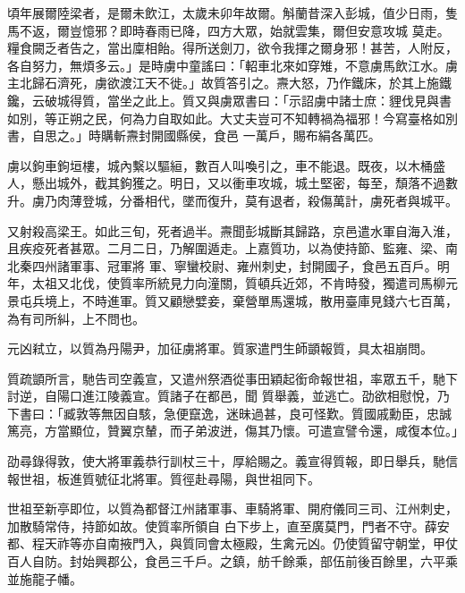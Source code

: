 \begin{pinyinscope}
 頃年展爾陸梁者，是爾未飲江，太歲未卯年故爾。斛蘭昔深入彭城，值少日雨，隻馬不返，爾豈憶邪？即時春雨已降，四方大眾，始就雲集，爾但安意攻城
 莫走。糧食闕乏者告之，當出廩相飴。得所送劍刀，欲令我揮之爾身邪！甚苦，人附反，各自努力，無煩多云。」是時虜中童謠曰：「軺車北來如穿雉，不意虜馬飲江水。虜主北歸石濟死，虜欲渡江天不徙。」故質答引之。燾大怒，乃作鐵床，於其上施鐵鑱，云破城得質，當坐之此上。質又與虜眾書曰：「示詔虜中諸士庶：貍伐見與書如別，等正朔之民，何為力自取如此。大丈夫豈可不知轉禍為福邪！今寫臺格如別書，自思之。」時購斬燾封開國縣侯，食邑
 一萬戶，賜布絹各萬匹。



 虜以鉤車鉤垣樓，城內繫以驅絙，數百人叫喚引之，車不能退。既夜，以木桶盛人，懸出城外，截其鉤獲之。明日，又以衝車攻城，城土堅密，每至，頹落不過數升。虜乃肉薄登城，分番相代，墜而復升，莫有退者，殺傷萬計，虜死者與城平。



 又射殺高梁王。如此三旬，死者過半。燾聞彭城斷其歸路，京邑遣水軍自海入淮，且疾疫死者甚眾。二月二日，乃解圍遁走。上嘉質功，以為使持節、監雍、梁、南北秦四州諸軍事、冠軍將
 軍、寧蠻校尉、雍州刺史，封開國子，食邑五百戶。明年，太祖又北伐，使質率所統見力向潼關，質頓兵近郊，不肯時發，獨遣司馬柳元景屯兵境上，不時進軍。質又顧戀嬖妾，棄營單馬還城，散用臺庫見錢六七百萬，為有司所糾，上不問也。



 元凶弒立，以質為丹陽尹，加征虜將軍。質家遣門生師顗報質，具太祖崩問。



 質疏顗所言，馳告司空義宣，又遣州祭酒從事田穎起銜命報世祖，率眾五千，馳下討逆，自陽口進江陵義宣。質諸子在都邑，聞
 質舉義，並逃亡。劭欲相慰悅，乃下書曰：「臧敦等無因自駭，急便竄逸，迷昧過甚，良可怪歎。質國戚勳臣，忠誠篤亮，方當顯位，贊翼京輦，而子弟波迸，傷其乃懷。可遣宣譬令還，咸復本位。」



 劭尋錄得敦，使大將軍義恭行訓杖三十，厚給賜之。義宣得質報，即日舉兵，馳信報世祖，板進質號征北將軍。質徑赴尋陽，與世祖同下。



 世祖至新亭即位，以質為都督江州諸軍事、車騎將軍、開府儀同三司、江州刺史，加散騎常侍，持節如故。使質率所領自
 白下步上，直至廣莫門，門者不守。薛安都、程天祚等亦自南掖門入，與質同會太極殿，生禽元凶。仍使質留守朝堂，甲仗百人自防。封始興郡公，食邑三千戶。之鎮，舫千餘乘，部伍前後百餘里，六平乘並施龍子幡。




\end{pinyinscope}
